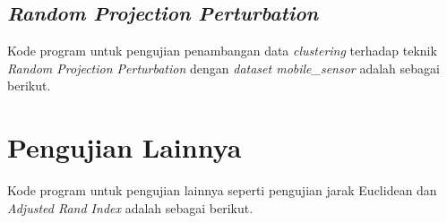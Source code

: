 \subsection{\textit{Random Projection Perturbation}}
\label{subsec:kmeans-projection-perturbation}
Kode program untuk pengujian penambangan data \textit{clustering} terhadap teknik \textit{Random Projection Perturbation} dengan \textit{dataset mobile\_sensor} adalah sebagai berikut.


\section{Pengujian Lainnya}
\label{sec:pengujian-lainnya}

Kode program untuk pengujian lainnya seperti pengujian jarak Euclidean dan \textit{Adjusted Rand Index} adalah sebagai berikut.

